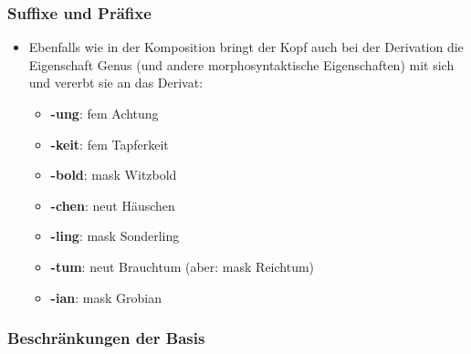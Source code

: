 
\begin{frame}
\frametitle{Suffixe und Präfixe}

\begin{itemize}
	\item Ebenfalls wie in der Komposition bringt der Kopf auch bei der Derivation die Eigenschaft Genus (und andere morphosyntaktische Eigenschaften) mit sich und vererbt sie an das Derivat:
	
\vspace{1em}
	
	\begin{itemize}
		\item \textbf{-ung}: fem Achtung
		\item \textbf{-keit}: fem Tapferkeit
		\item \textbf{-bold}: mask Witzbold
		\item \textbf{-chen}: neut Häuschen
		\item \textbf{-ling}: mask Sonderling
		\item \textbf{-tum}: neut Brauchtum (aber: mask Reichtum)
		\item \textbf{-ian}: mask Grobian
	\end{itemize}
	
\end{itemize}


\end{frame}


\subsubsection{Beschränkungen der Basis}


